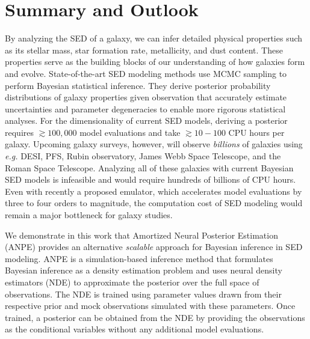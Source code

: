 \section{Summary and Outlook} \label{sec:summary}
By analyzing the SED of a galaxy, we can infer detailed physical properties
such as its stellar mass, star formation rate, metallicity, and dust content. 
These properties serve as the building blocks of our understanding of how
galaxies form and evolve. 
State-of-the-art SED modeling methods use MCMC sampling to perform Bayesian
statistical inference. 
They derive posterior probability distributions of galaxy properties given
observation that accurately estimate uncertainties and parameter degeneracies
to enable more rigorous statistical analyses. 
For the dimensionality of current SED models, deriving a posterior requires 
${\gtrsim}100,000$ model evaluations and take ${\gtrsim}10-100$ CPU hours per 
galaxy. 
Upcoming galaxy surveys, however, will observe \emph{billions} of galaxies
using \emph{e.g.} DESI, PFS, Rubin observatory, James Webb Space Telescope, and
the Roman Space Telescope. 
Analyzing all of these galaxies with current Bayesian SED models is infeasible
and would require hundreds of billions of CPU hours.
Even with recently a proposed emulator, which accelerates model evaluations 
by three to four orders to magnitude, the computation cost of SED modeling
would remain a major bottleneck for galaxy studies. 

We demonstrate in this work that Amortized Neural Posterior Estimation (ANPE)
provides an alternative \emph{scalable} approach for Bayesian inference in SED
modeling.
ANPE is a simulation-based inference method that formulates Bayesian inference 
as a density estimation problem and uses  neural density estimators (NDE) 
to approximate the posterior over the full space of observations. 
The NDE is trained using parameter values drawn from their respective prior and mock
observations simulated with these parameters.  
Once trained, a posterior can be obtained from the NDE by providing the observations 
as the conditional variables without any additional model evaluations. 

